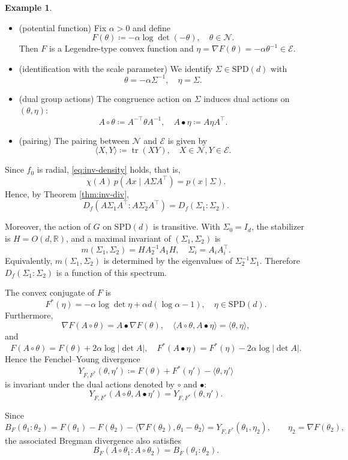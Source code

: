 \documentclass[a4paper, reqno, 11pt]{article}
\theoremstyle{definition}
\newtheorem{Exa}[Thm]{Example}
\def\SPD{\mathrm{SPD}}
\begin{document}
\begin{Exa}
\begin{itemize}
\item (potential function)  Fix $\alpha>0$ and define
\[ F(\theta) \coloneqq -\alpha\log\det(-\theta), \quad \theta\in\mathcal{N}. \]
Then $F$ is a Legendre-type convex function and
$\eta = \nabla F(\theta) = -\alpha\theta^{-1}\in\mathcal{E}$. 

\item (identification with the scale parameter)  We identify $\Sigma\in \SPD(d)$ with
\[ \theta = -\alpha\Sigma^{-1},\quad \eta=\Sigma.\]

\item (dual group actions)  The congruence action on $\Sigma$ induces dual actions on $(\theta,\eta)$:
\[ A\circ\theta\coloneqq A^{-\top}\theta A^{-1},\quad A\bullet\eta\coloneqq A\eta A^\top. \]

\item (pairing)  The pairing between $\mathcal{N}$ and $\mathcal{E}$ is given by
\[ \langle X,Y\rangle\coloneqq \operatorname{tr}(XY), \quad X \in \mathcal{N}, Y \in \mathcal{E}. \]
\end{itemize}

Since $f_0$ is radial, \eqref{eq:inv-density} holds, that is, 
\[ \chi(A)\,p(Ax\mid A\Sigma A^\top) = p(x\mid\Sigma).\]
Hence, by Theorem \ref{thm:inv-div},
\[ D_{f} (A \Sigma_{1} A^\top : A \Sigma_{2} A^\top) = D_{f}(\Sigma_1 : \Sigma_2). \]

Moreover, the action of $G$ on $\SPD(d)$ is transitive. 
With $\Sigma_0 = I_d$, the stabilizer
is $H=O(d,\mathbb{R})$, and a maximal invariant of $(\Sigma_1,\Sigma_2)$ is
\[ m(\Sigma_1,\Sigma_2) = HA_2^{-1}A_1H,\quad \Sigma_i=A_iA_i^\top. \]
Equivalently, $m(\Sigma_1,\Sigma_2)$ is determined by the eigenvalues of
$\Sigma_2^{-1}\Sigma_1$. Therefore $D_f(\Sigma_1:\Sigma_2)$ is a function of this spectrum.

The convex conjugate of $F$ is
\[ F^{*} (\eta) = -\alpha\log\det\eta + \alpha d(\log\alpha-1),\quad \eta\in \SPD(d). \]
Furthermore,
\[ \nabla F(A\circ\theta)=A\bullet\nabla F(\theta), \quad \langle A\circ\theta,A\bullet\eta\rangle = \langle\theta,\eta\rangle, \]
and
\[ F(A\circ\theta) = F(\theta)+2\alpha\log|\det A|, \quad F^*(A\bullet\eta) = F^*(\eta)-2\alpha\log|\det A|.\]
Hence the Fenchel--Young divergence~\cite{Acharyya2013LearningToRank}
\[ Y_{F,F^*}(\theta,\eta')\coloneqq F(\theta)+F^*(\eta')-\langle\theta,\eta'\rangle \]
is invariant under the dual actions denoted by $\circ$ and $\bullet$:
\[ Y_{F,F^*}(A\circ\theta,A\bullet\eta')=Y_{F,F^*}(\theta,\eta'). \]

Since
\[ B_F(\theta_1:\theta_2) = F(\theta_1)-F(\theta_2)-\langle \nabla F(\theta_2),\theta_1-\theta_2\rangle = Y_{F,F^*}(\theta_1,\eta_2), \qquad \eta_2=\nabla F(\theta_2),\]
the associated Bregman divergence also satisfies
\[ B_F (A\circ\theta_1:A\circ\theta_2) = B_F(\theta_1:\theta_2).\]


\end{Exa}
\end{document}
